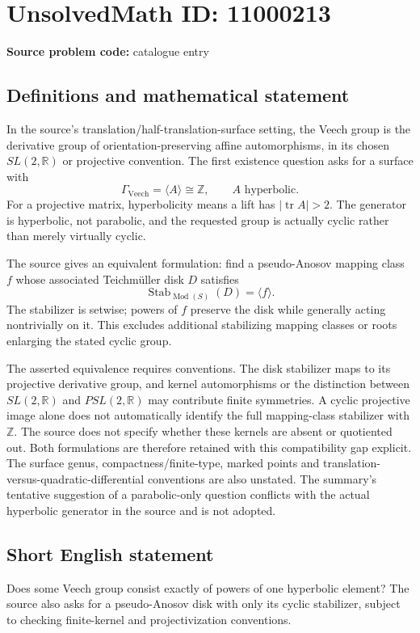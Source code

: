 \documentclass[11pt]{article}
\newcommand{\Z}{\mathbb{Z}}
\newcommand{\R}{\mathbb{R}}
\begin{document}
\section*{UnsolvedMath ID: 11000213}
\textbf{Source problem code:} catalogue entry
\subsection{Definitions and mathematical statement}
In the source's translation/half-translation-surface setting, the Veech group is the derivative group of orientation-preserving affine automorphisms, in its chosen \(SL(2,\R)\) or projective convention. The first existence question asks for a surface with
\[\Gamma_{\mathrm{Veech}}=\langle A\rangle\cong\Z,\qquad A\text{ hyperbolic}.\]
For a projective matrix, hyperbolicity means a lift has \(|\operatorname{tr}A|>2\). The generator is hyperbolic, not parabolic, and the requested group is actually cyclic rather than merely virtually cyclic.

The source gives an equivalent formulation: find a pseudo-Anosov mapping class \(f\) whose associated Teichm\"uller disk \(D\) satisfies
\[\operatorname{Stab}_{\operatorname{Mod}(S)}(D)=\langle f\rangle.\]
The stabilizer is setwise; powers of \(f\) preserve the disk while generally acting nontrivially on it. This excludes additional stabilizing mapping classes or roots enlarging the stated cyclic group.

The asserted equivalence requires conventions. The disk stabilizer maps to its projective derivative group, and kernel automorphisms or the distinction between \(SL(2,\R)\) and \(PSL(2,\R)\) may contribute finite symmetries. A cyclic projective image alone does not automatically identify the full mapping-class stabilizer with \(\Z\). The source does not specify whether these kernels are absent or quotiented out. Both formulations are therefore retained with this compatibility gap explicit. The surface genus, compactness/finite-type, marked points and translation-versus-quadratic-differential conventions are also unstated. The summary's tentative suggestion of a parabolic-only question conflicts with the actual hyperbolic generator in the source and is not adopted.
\subsection{Short English statement}
Does some Veech group consist exactly of powers of one hyperbolic element? The source also asks for a pseudo-Anosov disk with only its cyclic stabilizer, subject to checking finite-kernel and projectivization conventions.
\end{document}
